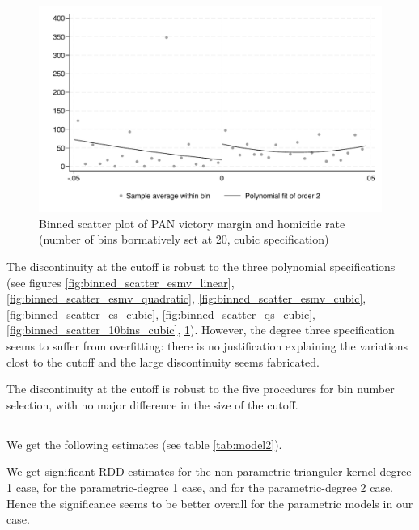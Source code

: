 \documentclass{article}
\begin{document}
\begin{figure}[H]
    \centering
    \includegraphics[scale=0.5]{../outputs/binned_scatter_20bins_cubic_plot.pdf}
    \caption{Binned scatter plot of PAN victory margin and homicide rate (number of bins bormatively set at 20, cubic specification)}
    \label{fig:binned_scatter_20bins_cubic}
\end{figure}

The discontinuity at the cutoff is robust to the three polynomial specifications (see figures \ref{fig:binned_scatter_esmv_linear}, \ref{fig:binned_scatter_esmv_quadratic}, \ref{fig:binned_scatter_esmv_cubic}, \ref{fig:binned_scatter_es_cubic}, \ref{fig:binned_scatter_qs_cubic}, \ref{fig:binned_scatter_10bins_cubic}, \ref{fig:binned_scatter_20bins_cubic}). However, the degree three specification seems to suffer from overfitting: there is no justification explaining the variations clost to the cutoff and the large discontinuity seems fabricated.

The discontinuity at the cutoff is robust to the five procedures for bin number selection, with no major difference in the size of the cutoff.


\subsection{}

We get the following estimates (see table \ref{tab:model2}).



We get significant RDD estimates for the non-parametric-trianguler-kernel-degree 1 case, for the parametric-degree 1 case, and for the parametric-degree 2 case. Hence the significance seems to be better overall for the parametric models in our case.
\end{document}

